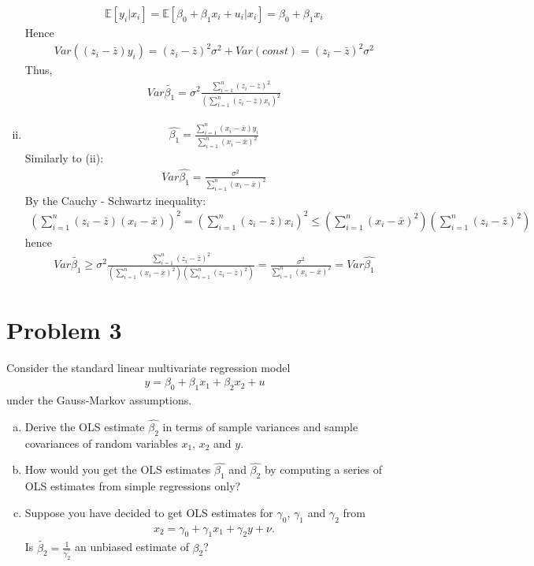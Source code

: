 \documentclass[a4paper]{article}
\newcommand{\expect}{\mathbb{E}}
\newcommand{\summa}{\sum_{i=1}^n}
\begin{document}
\begin{enumerate}[(i)]
\begin{align*}
	\expect[y_i|x_i] = \expect[\beta_0 + \beta_1x_i + u_i|x_i] = \beta_0 + \beta_1x_i
	\end{align*}
	Hence
	\begin{align*}
	Var ((z_i - \bar{z})y_i) = (z_i - \bar{z})^2\sigma^2 + Var(const) = (z_i - \bar{z})^2\sigma^2
	\end{align*}
	Thus, 
	\begin{align*}
	Var \tilde{\beta_1} = \sigma^2 \frac{\sum_{i=1}^n (z_i -  \bar{z})^2}{\left(\sum_{i=1}^n (z_i - \bar{z})x_i\right)^2}
	\end{align*}
	\item 
	\begin{align*}
	\hat{\beta_1} = \frac{\sum_{i=1}^n(x_i - \bar{x})y_i}{\sum_{i=1}^n(x_i - \bar{x})^2}
	\end{align*}
	Similarly to (ii):
	\begin{align*}
	Var \hat{\beta_1} = \frac{ \sigma^2}{\sum_{i=1}^n(x_i - \bar{x})^2}
	\end{align*}
	By the Cauchy - Schwartz inequality:
	\begin{align*}
	\left(\sum_{i=1}^n (z_i - \bar{z})(x_i - \bar{x})\right)^2 = \left(\sum_{i=1}^n (z_i - \bar{z})x_i\right)^2 \le \left(\sum_{i=1}^n (x_i - \bar{x})^2\right) \left(\sum_{i=1}^n (z_i - \bar{z})^2\right)
	\end{align*} 
	hence
	\begin{align*}
	Var \tilde{\beta_1} \ge \sigma^2 \frac{\summa (z_i - \bar{z})^2}{\left(\sum_{i=1}^n (x_i - \bar{x})^2\right) \left(\sum_{i=1}^n (z_i - \bar{z})^2\right)} = \frac{ \sigma^2}{\sum_{i=1}^n(x_i - \bar{x})^2} = Var \hat{\beta_1}
	\end{align*}
\end{enumerate}
\section*{Problem 3}
Consider the standard linear multivariate regression model
\begin{align*}
y = \beta_0 + \beta_1x_1 + \beta_2x_2 + u
\end{align*}
under the Gauss-Markov assumptions.
\begin{enumerate}[(a)]
\item Derive the OLS estimate $\hat{\beta_2}$ in terms of sample variances and sample covariances of
random variables $x_1$, $x_2$ and $y$.
\item How would you get the OLS estimates $\hat{\beta_1}$ and $\hat{\beta_2}$ by computing a series of OLS estimates
from simple regressions only?
\item Suppose you have decided to get OLS estimates for $\gamma_0$, $\gamma_1$ and $\gamma_2$ from
\begin{align*}
x_2 = \gamma_0 + \gamma_1x_1 + \gamma_2 y + \nu.
\end{align*}
Is $\tilde{\beta_2} = \frac{1}{\hat{\gamma_2}}$ an unbiased estimate of $\beta_2$?
\end{enumerate}
\end{document}
